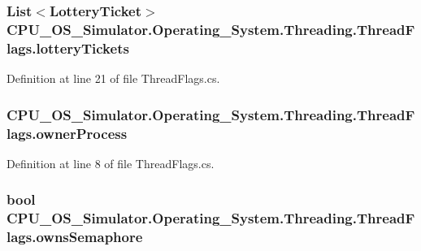 \subsubsection[{lottery\+Tickets}]{\setlength{\rightskip}{0pt plus 5cm}List$<${\bf Lottery\+Ticket}$>$ C\+P\+U\+\_\+\+O\+S\+\_\+\+Simulator.\+Operating\+\_\+\+System.\+Threading.\+Thread\+Flags.\+lottery\+Tickets}\label{struct_c_p_u___o_s___simulator_1_1_operating___system_1_1_threading_1_1_thread_flags_a0d79cd3049072a7573cad5b3dcb35419}


Definition at line 21 of file Thread\+Flags.\+cs.

\hypertarget{struct_c_p_u___o_s___simulator_1_1_operating___system_1_1_threading_1_1_thread_flags_a221fa945feaddce8cf77888e2346ae89}{}
\subsubsection[{owner\+Process}]{ C\+P\+U\+\_\+\+O\+S\+\_\+\+Simulator.\+Operating\+\_\+\+System.\+Threading.\+Thread\+Flags.\+owner\+Process}\label{struct_c_p_u___o_s___simulator_1_1_operating___system_1_1_threading_1_1_thread_flags_a221fa945feaddce8cf77888e2346ae89}


Definition at line 8 of file Thread\+Flags.\+cs.

\hypertarget{struct_c_p_u___o_s___simulator_1_1_operating___system_1_1_threading_1_1_thread_flags_a05c61a19f2ce3a9239896e9720580c0a}{}
\subsubsection[{owns\+Semaphore}]{\setlength{\rightskip}{0pt plus 5cm}bool C\+P\+U\+\_\+\+O\+S\+\_\+\+Simulator.\+Operating\+\_\+\+System.\+Threading.\+Thread\+Flags.\+owns\+Semaphore}\label{struct_c_p_u___o_s___simulator_1_1_operating___system_1_1_threading_1_1_thread_flags_a05c61a19f2ce3a9239896e9720580c0a}


